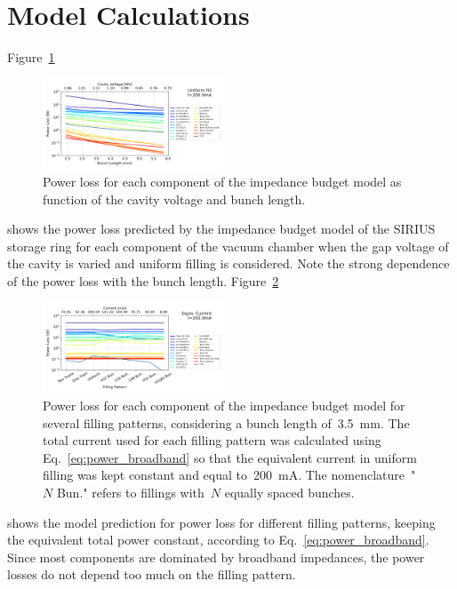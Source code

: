\documentclass
[
    a4paper,
]{jacow}
\begin{document}
\section{Model Calculations}

    Figure~\ref{fig:model_vary_vgap}
    \begin{figure}
        \centering
        \includegraphics[width=0.48\textwidth]{THPC44_f4.png}
        \caption{Power loss for each component of the impedance budget model as function of the cavity voltage and bunch length.}
        \label{fig:model_vary_vgap}
    \end{figure}
     shows the power loss predicted by the impedance budget model of the SIRIUS storage ring for each component of the vacuum chamber when the gap voltage of the cavity is varied and uniform filling is considered. Note the strong dependence of the power loss with the bunch length. Figure~\ref{fig:model_vary_fillp}
    \begin{figure}
        \centering
        \includegraphics[width=0.48\textwidth]{THPC44_f5.png}
        \caption{Power loss for each component of the impedance budget model for several filling patterns, considering a bunch length of~\SI{3.5}{\milli\meter}. The total current used for each filling pattern was calculated using Eq.~\eqref{eq:power_broadband} so that the equivalent current in uniform filling was kept constant and equal to~\SI{200}{\milli\ampere}. The nomenclature~"$\!N$ Bun." refers to fillings with~$N$ equally spaced bunches.}
        \label{fig:model_vary_fillp}
    \end{figure}
     shows the model prediction for power loss for different filling patterns, keeping the equivalent total power constant, according to Eq.~\eqref{eq:power_broadband}. Since most components are dominated by broadband impedances, the power losses do not depend too much on the filling pattern.
    
\end{document}

